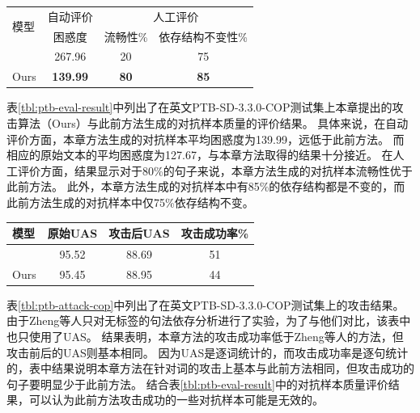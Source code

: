 \begin{table}[htbp]
    \vspace{0.5em}\centering\wuhao
	\begin{tabular}{lccc}
		\toprule[1.5pt]
		\multirow{2}{*}{模型}& 自动评价 & \multicolumn{2}{c}{人工评价} \\
		\cmidrule(r){2-2} \cmidrule(r){3-4}
		& 困惑度 &  流畅性\% & 依存结构不变性\%  \\
		\midrule[1pt]
		\citet{zheng-etal-2020-evaluating} & 267.96 & 20 & 75 \\
		Ours &\bf 139.99 &\bf 80 &\bf 85  \\
		\bottomrule[1.5pt]
	\end{tabular}
\end{table}

表\ref{tbl:ptb-eval-result}中列出了在英文PTB-SD-3.3.0-COP测试集上本章提出的攻击算法（Ours）与此前方法生成的对抗样本质量的评价结果。
具体来说，在自动评价方面，本章方法生成的对抗样本平均困惑度为139.99，远低于此前方法。
而相应的原始文本的平均困惑度为127.67，与本章方法取得的结果十分接近。
在人工评价方面，结果显示对于80\%的句子来说，本章方法生成的对抗样本流畅性优于此前方法。
此外，本章方法生成的对抗样本中有85\%的依存结构都是不变的，而此前方法生成的对抗样本中仅75\%依存结构不变。

\begin{table}[htbp]
    \vspace{0.5em}\centering\wuhao
	\begin{tabular}{lccc}
		\toprule[1.5pt]
		模型& 原始UAS & 攻击后UAS & 攻击成功率\% \\
		\midrule[1pt]
		\citet{zheng-etal-2020-evaluating} & 95.52 & 88.69 & 51 \\
		Ours & 95.45 & 88.95 &  44 \\
		\bottomrule[1.5pt]
	\end{tabular}
\end{table}

表\ref{tbl:ptb-attack-cop}中列出了在英文PTB-SD-3.3.0-COP测试集上的攻击结果。
由于Zheng等人只对无标签的句法依存分析进行了实验，为了与他们对比，该表中也只使用了UAS。
结果表明，本章方法的攻击成功率低于Zheng等人的方法，但攻击前后的UAS则基本相同。
因为UAS是逐词统计的，而攻击成功率是逐句统计的，表中结果说明本章方法在针对词的攻击上基本与此前方法相同，但攻击成功的句子要明显少于此前方法。
结合表\ref{tbl:ptb-eval-result}中的对抗样本质量评价结果，可以认为此前方法攻击成功的一些对抗样本可能是无效的。


